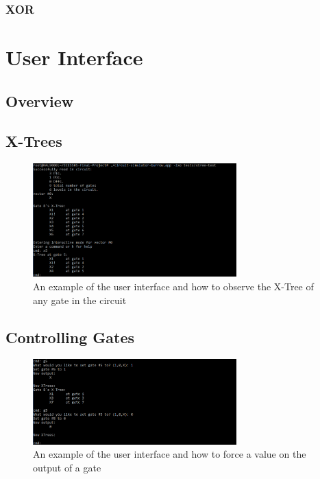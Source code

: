 \documentclass[12pt]{report}
\begin{document}
\subsection{XOR}

\chapter{User Interface}
\label{sec:ui}

\section{Overview}

\section{X-Trees}

\begin{figure}[h]
	\centering
	\includegraphics[width=0.7\textwidth]{sim-xtree-cmd.png}
	\caption[UI X-Tree Viewer]{An example of the user interface and how to observe the X-Tree of any gate in the circuit}
	\label{fig:sim-xtree-cmd}
\end{figure}

\section{Controlling Gates}

\begin{figure}[h]
	\centering
	\includegraphics[width=0.7\textwidth]{sim-gate-cmd.png}
	\caption[UI Gate Controller]{An example of the user interface and how to force a value on the output of a gate}
	\label{fig:sim-gate-cmd}
\end{figure}




\appendix

\end{document}
